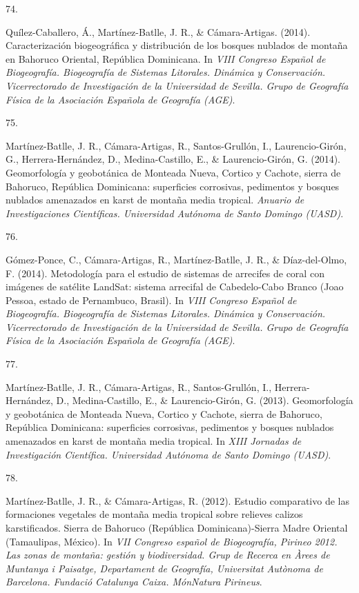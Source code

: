 \documentclass[10pt,a4paper,]{article}
\newlength{\cslhangindent}
\newlength{\csllabelwidth}
\newcommand{\CSLLeftMargin}[1]{\parbox[t]{\csllabelwidth}{\hfill #1~}}
\newcommand{\CSLRightInline}[1]{\parbox[t]{\linewidth - \cslhangindent - \csllabelwidth}{#1}\vspace{0.8ex}}
\begin{document}
\leavevmode\hypertarget{ref-Jose_Ramon_Martinez-Batlle_76606520}{}%
\CSLLeftMargin{74. }
\CSLRightInline{Quílez-Caballero, Á., Martínez-Batlle, J. R., \&
Cámara-Artigas. (2014). Caracterización biogeográfica y distribución de
los bosques nublados de montaña en Bahoruco Oriental, República
Dominicana. In \emph{VIII Congreso Español de Biogeografía. Biogeografía
de Sistemas Litorales. Dinámica y Conservación. Vicerrectorado de
Investigación de la Universidad de Sevilla. Grupo de Geografía Física de
la Asociación Española de Geografía (AGE)}.}

\leavevmode\hypertarget{ref-Jose_Ramon_Martinez-Batlle_76609683}{}%
\CSLLeftMargin{75. }
\CSLRightInline{Martínez-Batlle, J. R., Cámara-Artigas, R.,
Santos-Grullón, I., Laurencio-Girón, G., Herrera-Hernández, D.,
Medina-Castillo, E., \& Laurencio-Girón, G. (2014). Geomorfología y
geobotánica de Monteada Nueva, Cortico y Cachote, sierra de Bahoruco,
República Dominicana: superficies corrosivas, pedimentos y bosques
nublados amenazados en karst de montaña media tropical. \emph{Anuario de
Investigaciones Científicas. Universidad Autónoma de Santo Domingo
(UASD)}.}

\leavevmode\hypertarget{ref-Jose_Ramon_Martinez-Batlle_108102314}{}%
\CSLLeftMargin{76. }
\CSLRightInline{Gómez-Ponce, C., Cámara-Artigas, R., Martínez-Batlle, J.
R., \& Díaz-del-Olmo, F. (2014). Metodología para el estudio de sistemas
de arrecifes de coral con imágenes de satélite LandSat: sistema
arrecifal de Cabedelo-Cabo Branco (Joao Pessoa, estado de Pernambuco,
Brasil). In \emph{VIII Congreso Español de Biogeografía. Biogeografía de
Sistemas Litorales. Dinámica y Conservación. Vicerrectorado de
Investigación de la Universidad de Sevilla. Grupo de Geografía Física de
la Asociación Española de Geografía (AGE)}.}

\leavevmode\hypertarget{ref-Jose_Ramon_Martinez-Batlle_108102047}{}%
\CSLLeftMargin{77. }
\CSLRightInline{Martínez-Batlle, J. R., Cámara-Artigas, R.,
Santos-Grullón, I., Herrera-Hernández, D., Medina-Castillo, E., \&
Laurencio-Girón, G. (2013). Geomorfología y geobotánica de Monteada
Nueva, Cortico y Cachote, sierra de Bahoruco, República Dominicana:
superficies corrosivas, pedimentos y bosques nublados amenazados en
karst de montaña media tropical. In \emph{XIII Jornadas de Investigación
Científica. Universidad Autónoma de Santo Domingo (UASD)}.}

\leavevmode\hypertarget{ref-Jose_Ramon_Martinez-Batlle_108102200}{}%
\CSLLeftMargin{78. }
\CSLRightInline{Martínez-Batlle, J. R., \& Cámara-Artigas, R. (2012).
Estudio comparativo de las formaciones vegetales de montaña media
tropical sobre relieves calizos karstificados. Sierra de Bahoruco
(República Dominicana)-Sierra Madre Oriental (Tamaulipas, México). In
\emph{VII Congreso español de Biogeografía, Pirineo 2012. Las zonas de
montaña: gestión y biodiversidad. Grup de Recerca en Àrees de Muntanya i
Paisatge, Departament de Geografía, Universitat Autònoma de Barcelona.
Fundació Catalunya Caixa. MónNatura Pirineus}.}
\end{document}
